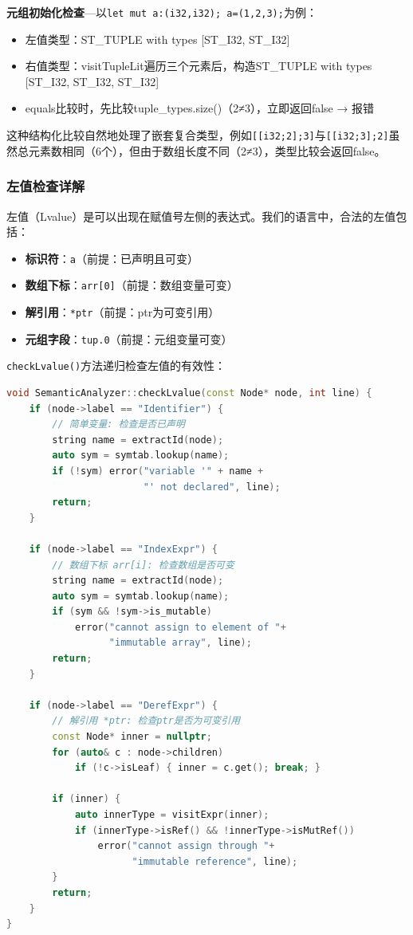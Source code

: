 \documentclass[12pt,a4paper]{ctexart}
\begin{document}
\textbf{元组初始化检查}—以\texttt{let mut a:(i32,i32); a=(1,2,3);}为例：
\begin{itemize}
    \item 左值类型：ST\_TUPLE with types [ST\_I32, ST\_I32]
    \item 右值类型：visitTupleLit遍历三个元素后，构造ST\_TUPLE with types [ST\_I32, ST\_I32, ST\_I32]
    \item equals比较时，先比较tuple\_types.size()（2≠3），立即返回false → 报错
\end{itemize}

这种结构化比较自然地处理了嵌套复合类型，例如\texttt{[[i32;2];3]}与\texttt{[[i32;3];2]}虽然总元素数相同（6个），但由于数组长度不同（2≠3），类型比较会返回false。

\subsubsection{左值检查详解}

左值（Lvalue）是可以出现在赋值号左侧的表达式。我们的语言中，合法的左值包括：
\begin{itemize}
    \item \textbf{标识符}：\texttt{a}（前提：已声明且可变）
    \item \textbf{数组下标}：\texttt{arr[0]}（前提：数组变量可变）
    \item \textbf{解引用}：\texttt{*ptr}（前提：ptr为可变引用）
    \item \textbf{元组字段}：\texttt{tup.0}（前提：元组变量可变）
\end{itemize}

\texttt{checkLvalue()}方法递归检查左值的有效性：

\begin{lstlisting}[language=C++, caption={左值检查实现}]
void SemanticAnalyzer::checkLvalue(const Node* node, int line) {
    if (node->label == "Identifier") {
        // 简单变量: 检查是否已声明
        string name = extractId(node);
        auto sym = symtab.lookup(name);
        if (!sym) error("variable '" + name +
                        "' not declared", line);
        return;
    }

    if (node->label == "IndexExpr") {
        // 数组下标 arr[i]: 检查数组是否可变
        string name = extractId(node);
        auto sym = symtab.lookup(name);
        if (sym && !sym->is_mutable)
            error("cannot assign to element of "+
                  "immutable array", line);
        return;
    }

    if (node->label == "DerefExpr") {
        // 解引用 *ptr: 检查ptr是否为可变引用
        const Node* inner = nullptr;
        for (auto& c : node->children)
            if (!c->isLeaf) { inner = c.get(); break; }

        if (inner) {
            auto innerType = visitExpr(inner);
            if (innerType->isRef() && !innerType->isMutRef())
                error("cannot assign through "+
                      "immutable reference", line);
        }
        return;
    }
}
\end{lstlisting}
\end{document}

